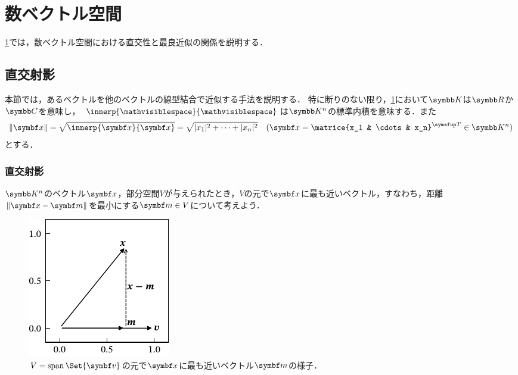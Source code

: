 \documentclass[../../main]{subfiles}
\begin{document}
\chapter{数ベクトル空間}
\label{chapter:numerical_vector_space}

\begin{lead}
  \cref{chapter:numerical_vector_space}では，数ベクトル空間における直交性と最良近似の関係を説明する．
\end{lead}

\section{直交射影}

本節では，あるベクトルを他のベクトルの線型結合で近似する手法を説明する．
特に断りのない限り，\cref{chapter:numerical_vector_space}において\(\numset{K}\)は\(\numset{R}\)か\(\numset{C}\)を意味し，
\(\innerp{\holder}{\holder}\)は\(\numset{K}^n\)の標準内積を意味する．また
\[
  \vnorm{\vect{x}} = \sqrt{\innerp{\vect{x}}{\vect{x}}}
  = \sqrt{\abs{x_1}^2+\dots+\abs{x_n}^2}
  \quad(\vect{x}=\trps{\matrice{x_1 & \cdots & x_n}}\in\numset{K}^n)
\]
とする\index{\(\vnorm{\holder}\)}．

\subsection{直交射影}

\(\numset{K}^n\)のベクトル\(\vect{x}\)，部分空間\(V\)が与えられたとき，\(V\)の元で\(\vect{x}\)に最も近いベクトル，すなわち，距離\(\vnorm{\vect{x}-\vect{m}}\)を最小にする\(\vect{m}\in V\)について考えよう．

\begin{figure}[htbp]
  \centering
  \includegraphics{proj2d.pdf}
  \caption{\(V=\spannedby\Set{\vect{v}}\)の元で\(\vect{x}\)に最も近いベクトル\(\vect{m}\)の様子．}
  \label{figure:proj2d}
\end{figure}
\end{document}
